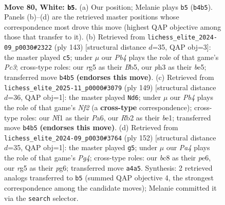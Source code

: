 \documentclass[11pt]{article}
\begin{document}
\clearpage

\begin{figure}[p]\centering
\begin{subfigure}{0.46\textwidth}\centering
\resizebox{\linewidth}{!}{%
\newchessgame
\chessboard[
  setfen={1Bb5/5k2/8/6r1/PP2B3/2K4p/1R6/5N2 w - - 17 80},
  showmover=false,
  pgfstyle=straightmove, color=movearrow, markmove={b4-b5}
]}
\caption{}
\end{subfigure}\hfill
\begin{subfigure}{0.46\textwidth}\centering
\resizebox{\linewidth}{!}{%
\newchessgame
\chessboard[
  setfen={8/4K2k/2p3r1/Pb2B3/8/8/8/3R4 b - - 9 72},
  showmover=false,
  pgfstyle=straightmove, color=movearrow, markmove={c6-c5}
]}
\caption{}
\end{subfigure}
\\[4pt]
\begin{subfigure}{0.46\textwidth}\centering
\resizebox{\linewidth}{!}{%
\newchessgame
\chessboard[
  setfen={8/5n2/p1k5/P1p5/2b2K2/8/3R4/4B3 b - - 28 75},
  showmover=false,
  pgfstyle=straightmove, color=movearrow, markmove={f7-d6}
]}
\caption{}
\end{subfigure}\hfill
\begin{subfigure}{0.46\textwidth}\centering
\resizebox{\linewidth}{!}{%
\newchessgame
\chessboard[
  setfen={8/5R2/4p1p1/4k3/6PP/2r5/5PK1/8 w - - 0 77},
  showmover=false,
  pgfstyle=straightmove, color=movearrow, markmove={g4-g5}
]}
\caption{}
\end{subfigure}
\caption{\textbf{Move 80, White: \texttt{b5}.} (a) Our position; Melanie plays \texttt{b5} (\texttt{b4b5}). Panels (b)--(d) are the retrieved master positions whose correspondence most drove this move (highest QAP objective among those that transfer to it). (b) Retrieved from \texttt{lichess\_elite\_2024-09\_p0030\#2322} (ply 143) [structural distance $d$=35, QAP obj=3]: the master played \texttt{c5}; under $\mu$ our \emph{Pb4} plays the role of that game's \emph{Pc3}; cross-type roles: our \emph{r}g5 as their \emph{B}b5, our \emph{p}h3 as their \emph{b}e5; transferred move \texttt{b4b5} \textbf{(endorses this move)}. (c) Retrieved from \texttt{lichess\_elite\_2025-11\_p0000\#3079} (ply 149) [structural distance $d$=36, QAP obj=1]: the master played \texttt{Nd6}; under $\mu$ our \emph{Pb4} plays the role of that game's \emph{Nf2} (a \textbf{cross-type} correspondence); cross-type roles: our \emph{N}f1 as their \emph{P}a6, our \emph{R}b2 as their \emph{b}e1; transferred move \texttt{b4b5} \textbf{(endorses this move)}. (d) Retrieved from \texttt{lichess\_elite\_2024-09\_p0030\#3764} (ply 152) [structural distance $d$=35, QAP obj=1]: the master played \texttt{g5}; under $\mu$ our \emph{Pa4} plays the role of that game's \emph{Pg4}; cross-type roles: our \emph{b}c8 as their \emph{p}e6, our \emph{r}g5 as their \emph{p}g6; transferred move \texttt{a4a5}. Synthesis: 2 retrieved analogs transferred to \texttt{b5} (summed QAP objective 4, the strongest correspondence among the candidate moves); Melanie committed it via the \texttt{search} selector.}
\label{fig:thought-m158}
\end{figure}
\end{document}
